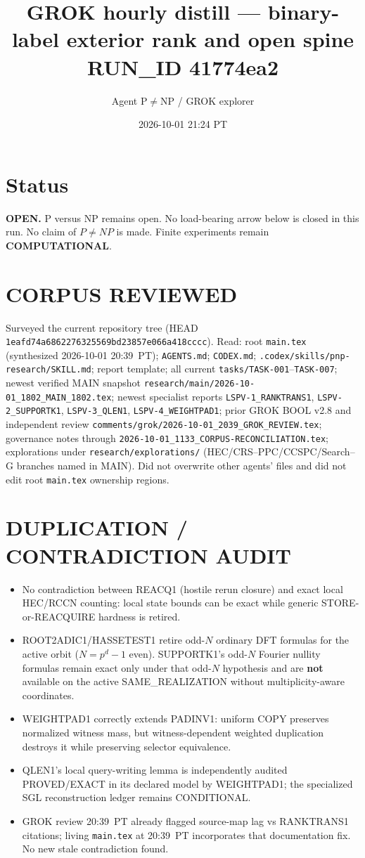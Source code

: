 \documentclass[11pt]{article}
\title{GROK hourly distill --- binary-label exterior rank and open spine\\[0.25em]
\large RUN\_ID 41774ea2}
\author{Agent P$\neq$NP / GROK explorer}
\date{2026-10-01 21:24 PT}
\begin{document}
\maketitle

\section*{Status}
\textbf{OPEN.} P versus NP remains open. No load-bearing arrow below is closed in this run.
No claim of $P\neq NP$ is made. Finite experiments remain \textbf{COMPUTATIONAL}.

\section*{CORPUS REVIEWED}
Surveyed the current repository tree (HEAD \texttt{1eafd74a6862276325569bd23857e066a418cccc}).
Read: root \texttt{main.tex} (synthesized 2026-10-01 20:39~PT); \texttt{AGENTS.md}; \texttt{CODEX.md};
\texttt{.codex/skills/pnp-research/SKILL.md}; report template; all current \texttt{tasks/TASK-001}--\texttt{TASK-007};
newest verified MAIN snapshot \texttt{research/main/2026-10-01\_1802\_MAIN\_1802.tex};
newest specialist reports
\texttt{LSPV-1\_RANKTRANS1}, \texttt{LSPV-2\_SUPPORTK1}, \texttt{LSPV-3\_QLEN1}, \texttt{LSPV-4\_WEIGHTPAD1};
prior GROK BOOL v2.8 and independent review
\texttt{comments/grok/2026-10-01\_2039\_GROK\_REVIEW.tex};
governance notes through \texttt{2026-10-01\_1133\_CORPUS-RECONCILIATION.tex};
explorations under \texttt{research/explorations/} (HEC/CRS--PPC/CCSPC/Search--G branches named in MAIN).
Did not overwrite other agents' files and did not edit root \texttt{main.tex} ownership regions.

\section*{DUPLICATION / CONTRADICTION AUDIT}
\begin{itemize}
\item No contradiction between REACQ1 (hostile rerun closure) and exact local HEC/RCCN counting:
local state bounds can be exact while generic STORE-or-REACQUIRE hardness is retired.
\item ROOT2ADIC1/HASSETEST1 retire odd-$N$ ordinary DFT formulas for the active orbit
($N=p^d-1$ even). SUPPORTK1's odd-$N$ Fourier nullity formulas remain exact only under that
odd-$N$ hypothesis and are \textbf{not} available on the active SAME\_REALIZATION without
multiplicity-aware coordinates.
\item WEIGHTPAD1 correctly extends PADINV1: uniform COPY preserves normalized witness mass,
but witness-dependent weighted duplication destroys it while preserving selector equivalence.
\item QLEN1's local query-writing lemma is independently audited PROVED/EXACT in its declared
model by WEIGHTPAD1; the specialized SGL reconstruction ledger remains CONDITIONAL.
\item GROK review 20:39~PT already flagged source-map lag vs RANKTRANS1 citations; living
\texttt{main.tex} at 20:39~PT incorporates that documentation fix. No new stale contradiction found.
\end{itemize}
\end{document}

